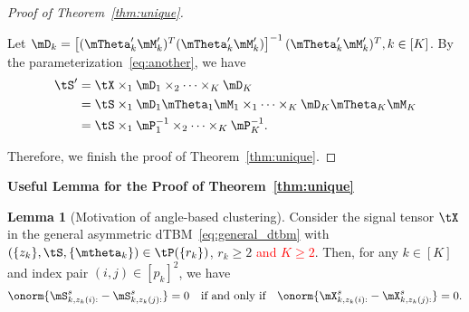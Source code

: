 \documentclass[lettersize,onecolumn,journal]{IEEEtran}
\theoremstyle{definition}
\newtheorem{lem}{Lemma}
\theoremstyle{definition}
\newcommand{\off}[1]{\left[#1\right]}
\begin{document}
\begin{proof}[Proof of Theorem~\ref{thm:unique}]
\begin{enumerate}[wide]
Let $\mD_k = \off{ (\mTheta'_k \mM'_k)^T (\mTheta'_k \mM'_k) }^{-1} (\mTheta'_k \mM'_k)^T, k \in [K]$. By the parameterization~\eqref{eq:another}, we have 
\begin{align}
    \tS' &= \tX \times_1 \mD_1 \times_2 \cdots \times_K \mD_K \\
    &= \tS \times_1 \mD_1 \mTheta_1 \mM_1 \times_1 \cdots \times_K \mD_K \mTheta_K \mM_K \\
    &= \tS \times_1 \mP^{-1}_1 \times_2 \cdots \times_K \mP^{-1}_K.
\end{align}


\end{enumerate}

Therefore, we finish the proof of Theorem~\ref{thm:unique}.
\end{proof}


{\bf Useful Lemma for the Proof of Theorem~\ref{thm:unique}} 

\begin{lem}[Motivation of angle-based clustering]\label{lem:angle} Consider the signal tensor $\tX$ in the general asymmetric dTBM~\eqref{eq:general_dtbm} with $(\{z_k\},\tS,\{\mtheta_k\})\in \tP(\{r_k\})$, $r_k \geq 2$ \textcolor{red}{ and $K \geq 2$}. Then, for any $k \in [K]$ and index pair $(i,j)\in[p_k]^2$, we have 
\begin{equation}
    \onorm{ \mS_{k,z_k(i):}^s -  \mS_{k,z_k(j):}^s } = 0 \quad \text{if and only if} \quad \onorm{  \mX_{k, z_k(i):}^s -  \mX_{k,z_k(j):}^s } = 0.
\end{equation}
\end{lem}
\end{document}
